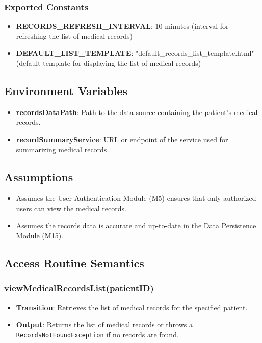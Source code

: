 \documentclass[12pt, titlepage]{article}
\begin{document}
\subsubsection{Exported Constants}
\begin{itemize}
\item \textbf{RECORDS\_REFRESH\_INTERVAL}: 10 minutes (interval for refreshing the list of medical records)
\item \textbf{DEFAULT\_LIST\_TEMPLATE}: "default\_records\_list\_template.html" (default template for displaying the list of medical records)
\end{itemize}

\subsection{Environment Variables}
\begin{itemize}
\item \textbf{recordsDataPath}: Path to the data source containing the patient's medical records.
\item \textbf{recordSummaryService}: URL or endpoint of the service used for summarizing medical records.
\end{itemize}

\subsection{Assumptions}
\begin{itemize}
\item Assumes the User Authentication Module (M5) ensures that only authorized users can view the medical records.
\item Assumes the records data is accurate and up-to-date in the Data Persistence Module (M15).
\end{itemize}

\subsection{Access Routine Semantics}
\subsubsection{viewMedicalRecordsList(patientID)}
\begin{itemize}
    \item \textbf{Transition}: Retrieves the list of medical records for the specified patient.
    \item \textbf{Output}: Returns the list of medical records or throws a \texttt{RecordsNotFoundException} if no records are found.
\end{itemize}
\end{document}

